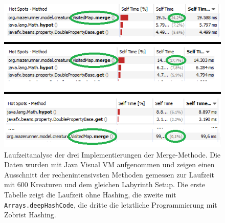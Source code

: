\begin{figure}[tb]
	\centering
	\includegraphics{images/benchmark.png}
	\caption{Laufzeitanalyse der drei Implementierungen der Merge-Methode. Die Daten wurden mit Java Visual VM aufgenommen und zeigen einen Ausschnitt der rechenintensivsten Methoden gemessen zur Laufzeit mit 600 Kreaturen und dem gleichen Labyrinth Setup. Die erste Tabelle zeigt die Laufzeit ohne Hashing, die zweite mit \lstinline{Arrays.deepHashCode}, die dritte die letztliche Programmierung mit Zobrist Hashing.}
	\label{fig:benchmark}
\end{figure}
